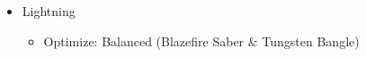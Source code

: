 \begin{multicols}{2}
  \begin{menu}
    \begin{itemize}
      \equip
      \begin{itemize}
        \item Lightning
              \begin{itemize}
                \item Optimize: Balanced (Blazefire Saber \& Tungsten Bangle)
              \end{itemize}
      \end{itemize}
    \end{itemize}
  \end{menu}

  \vfill
\end{multicols}
